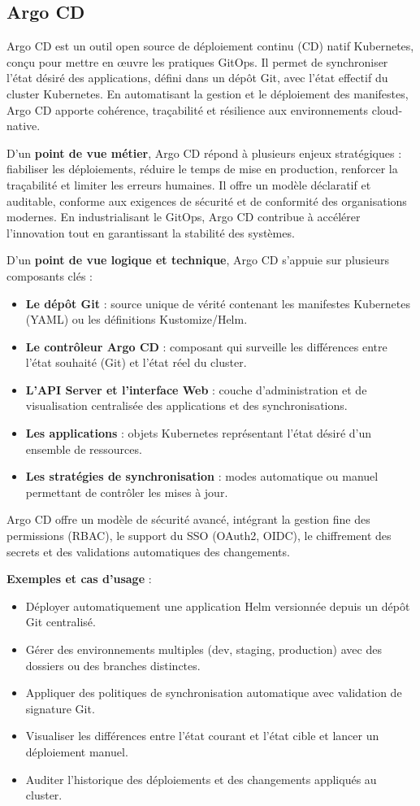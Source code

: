 \subsection{Argo CD}

Argo CD est un outil open source de déploiement continu (CD) natif Kubernetes, conçu pour mettre en œuvre les pratiques GitOps. Il permet de synchroniser l’état désiré des applications, défini dans un dépôt Git, avec l’état effectif du cluster Kubernetes. En automatisant la gestion et le déploiement des manifestes, Argo CD apporte cohérence, traçabilité et résilience aux environnements cloud-native.

D’un \textbf{point de vue métier}, Argo CD répond à plusieurs enjeux stratégiques  : fiabiliser les déploiements, réduire le temps de mise en production, renforcer la traçabilité et limiter les erreurs humaines. Il offre un modèle déclaratif et auditable, conforme aux exigences de sécurité et de conformité des organisations modernes. En industrialisant le GitOps, Argo CD contribue à accélérer l’innovation tout en garantissant la stabilité des systèmes.

D’un \textbf{point de vue logique et technique}, Argo CD s’appuie sur plusieurs composants clés  :
\begin{itemize}
	\item \textbf{Le dépôt Git}  : source unique de vérité contenant les manifestes Kubernetes (YAML) ou les définitions Kustomize/Helm.
	\item \textbf{Le contrôleur Argo CD}  : composant qui surveille les différences entre l’état souhaité (Git) et l’état réel du cluster.
	\item \textbf{L’API Server et l’interface Web}  : couche d’administration et de visualisation centralisée des applications et des synchronisations.
	\item \textbf{Les applications}  : objets Kubernetes représentant l’état désiré d’un ensemble de ressources.
	\item \textbf{Les stratégies de synchronisation}  : modes automatique ou manuel permettant de contrôler les mises à jour.
\end{itemize}

Argo CD offre un modèle de sécurité avancé, intégrant la gestion fine des permissions (RBAC), le support du SSO (OAuth2, OIDC), le chiffrement des secrets et des validations automatiques des changements.

\textbf{Exemples et cas d’usage} :
\begin{itemize}
	\item Déployer automatiquement une application Helm versionnée depuis un dépôt Git centralisé.
	\item Gérer des environnements multiples (dev, staging, production) avec des dossiers ou des branches distinctes.
	\item Appliquer des politiques de synchronisation automatique avec validation de signature Git.
	\item Visualiser les différences entre l’état courant et l’état cible et lancer un déploiement manuel.
	\item Auditer l’historique des déploiements et des changements appliqués au cluster.
\end{itemize}

